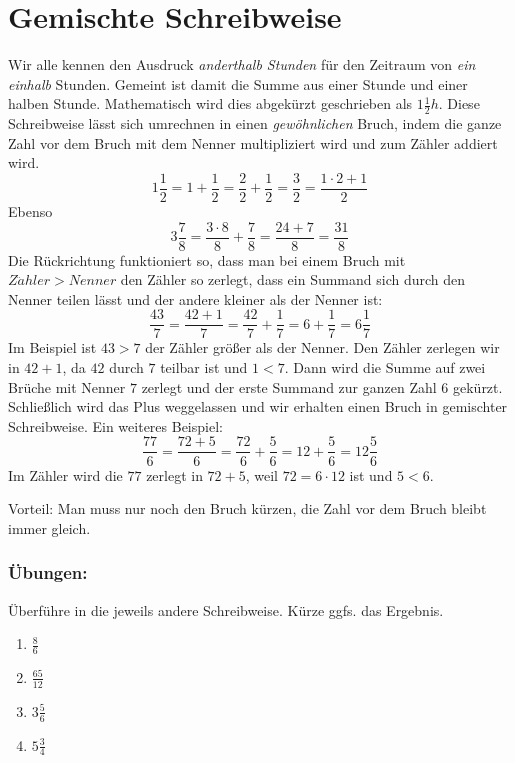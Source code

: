 \section{Gemischte Schreibweise}\vspace{-1em}
Wir alle kennen den Ausdruck \emph{anderthalb Stunden} für den Zeitraum von \emph{ein einhalb} Stunden. Gemeint ist damit die Summe aus einer Stunde und einer halben Stunde. Mathematisch wird dies abgekürzt geschrieben als $1\frac{1}{2}h$. Diese Schreibweise lässt sich umrechnen in einen \emph{gewöhnlichen} Bruch, indem die ganze Zahl vor dem Bruch mit dem Nenner multipliziert wird und zum Zähler addiert wird.
\begin{equation*}
	1\frac{1}{2}= 1+\frac{1}{2} = \frac{2}{2}+\frac{1}{2}=\frac{3}{2}=\frac{1\cdot 2+1}{2}
\end{equation*}
Ebenso
\begin{equation*}
	3\frac{7}{8}= \frac{3\cdot 8}{8}+\frac{7}{8}=\frac{24+7}{8}= \frac{31}{8}
\end{equation*}
Die Rückrichtung funktioniert so, dass man bei einem Bruch mit $Z\ddot{a}hler>Nenner$ den Zähler so zerlegt, dass ein Summand sich durch den Nenner teilen lässt und der andere kleiner als der Nenner ist:
\begin{equation*}
	\frac{43}{7}=\frac{42+1}{7}=\frac{42}{7}+\frac{1}{7}=6+\frac{1}{7}=6\frac{1}{7}
\end{equation*}
Im Beispiel ist $43>7$ der Zähler größer als der Nenner. Den Zähler zerlegen wir in $42+1$, da $42$ durch $7$ teilbar ist und $1<7$. Dann wird die Summe auf zwei Brüche mit Nenner $7$ zerlegt und der erste Summand zur ganzen Zahl $6$ gekürzt. Schließlich wird das Plus weggelassen und wir erhalten einen Bruch in gemischter Schreibweise.
Ein weiteres Beispiel:
\begin{equation*}
	\frac{77}{6}=\frac{72+5}{6}=\frac{72}{6}+\frac{5}{6}=12+\frac{5}{6}=12\frac{5}{6}
\end{equation*}
Im Zähler wird die $77$ zerlegt in $72+5$, weil $72=6\cdot12$ ist und $5<6$.

Vorteil: Man muss nur noch den Bruch kürzen, die Zahl vor dem Bruch bleibt immer gleich.

\subsubsection*{Übungen:}\vspace{-1em}
Überführe in die jeweils andere Schreibweise. Kürze ggfs. das Ergebnis.
\begin{multicols}{2}
	\begin{enumerate}[label=\alph*)]
		\item $\frac{8}{6}$
		\item $\frac{65}{12}$
		\item $3\frac{5}{6}$
		\item $5\frac{3}{4}$
	\end{enumerate}
\end{multicols}
